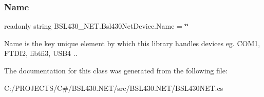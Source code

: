\subsubsection{\texorpdfstring{Name}{Name}}
{\footnotesize\ttfamily readonly string B\+S\+L430\+\_\+\+N\+E\+T.\+Bsl430\+Net\+Device.\+Name = \char`\"{}\char`\"{}}



Name is the key unique element by which this library handles devices eg. C\+O\+M1, F\+T\+D\+I2, libtfi3, U\+S\+B4 .. 



The documentation for this class was generated from the following file\+:\begin{DoxyCompactItemize}
\item 
C\+:/\+P\+R\+O\+J\+E\+C\+T\+S/\+C\#/\+B\+S\+L430.\+N\+E\+T/src/\+B\+S\+L430.\+N\+E\+T/B\+S\+L430\+N\+E\+T.\+cs\end{DoxyCompactItemize}
